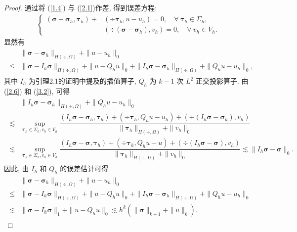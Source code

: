 	\begin{proof}
		通过将 (\ref{1.4}) 与 (\ref{2.1})作差, 得到误差方程:
		\begin{align}
			\label{3.2}
			\left\{
			\begin{array}{ll}
				(\boldsymbol\sigma-\boldsymbol\sigma_h, \boldsymbol\tau_h)+&(\div\boldsymbol\tau_h, u-u_h) = 0, \quad \forall \ \boldsymbol\tau_h\in\Sigma_h, \\
				&(\div(\boldsymbol\sigma-\boldsymbol\sigma_h), v_h) = 0, \quad \forall \ v_h\in V_h.
			\end{array}
			\right.
		\end{align}
		显然有
		\begin{align}\begin{split}
				\label{3.3}
				&\|\boldsymbol\sigma-\boldsymbol\sigma_h\|_{H(\div,\Omega)}+\|u-u_h\|_0\\
				\leq&\|\boldsymbol\sigma-I_h\boldsymbol\sigma\|_{H(\div,\Omega)}+\|u-Q_h u\|_0+\|I_h\boldsymbol\sigma-\boldsymbol\sigma_h\|_{H(\div,\Omega)}+\|Q_h u-u_h\|_0,
			\end{split}
		\end{align}
		其中 $I_h$ 为引理2.1的证明中提及的插值算子, $Q_h$ 为 $k-1$ 次 $L^2$ 正交投影算子. 由 (\ref{2.6}) 和 (\ref{3.2}), 可得
		\begin{align}\begin{split}
				\label{3.4}
				&\|I_h\boldsymbol\sigma-\boldsymbol\sigma_h\|_{H(\div,\Omega)}+\|Q_h u-u_h\|_0\\
				\lesssim&\sup_{\boldsymbol\tau_h\in \Sigma_h, v_h\in V_h}\dfrac{(I_h\boldsymbol\sigma-\boldsymbol\sigma_h,\boldsymbol\tau_h)+(\div\boldsymbol\tau_h, Q_h u-u_h)+(\div(I_h\boldsymbol\sigma-\boldsymbol\sigma_h),v_h)}{\|\boldsymbol\tau_h\|_{H(\div,\Omega)}+\|v_h\|_0}\\
				\lesssim&\sup_{\boldsymbol\tau_h\in \Sigma_h, v_h\in V_h}\dfrac{(I_h\boldsymbol\sigma-\boldsymbol\sigma,\boldsymbol\tau_h)+(\div\boldsymbol\tau_h, Q_h u-u)+(\div(I_h\boldsymbol\sigma-\boldsymbol\sigma),v_h)}{\|\boldsymbol\tau_h\|_{H(\div,\Omega)}+\|v_h\|_0}\lesssim\|I_h\boldsymbol\sigma-\boldsymbol\sigma\|_0.
			\end{split}
		\end{align}
		因此, 由 $I_h$ 和 $Q_h$ 的误差估计可得
		\begin{align}\begin{split}
				\label{3.5}
				&\|\boldsymbol\sigma-\boldsymbol\sigma_h\|_{H(\div,\Omega)}+\|u-u_h\|_0\\
				\leq&\|\boldsymbol\sigma-I_h\boldsymbol\sigma\|_{H(\div,\Omega)}+\|u-Q_h u\|_0+\|I_h\boldsymbol\sigma-\boldsymbol\sigma_h\|_{H(\div,\Omega)}+\|Q_h u-u_h\|_0\\
				\lesssim&\|\boldsymbol\sigma-I_h\boldsymbol\sigma\|_1+\|u-Q_h u\|_0\lesssim h^k(\|\boldsymbol\sigma\|_{k+1}+\|u\|_k).
			\end{split}
		\end{align}
	\end{proof}
	
